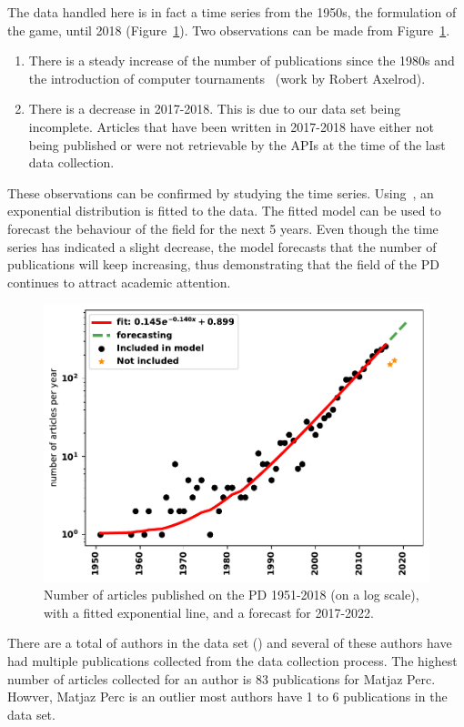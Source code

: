 \documentclass{article}
\theoremstyle{definition}
\newcommand{\authors}{}
\begin{document}
The data handled  here is in fact a time series from the 1950s, the formulation
of the game, until 2018 (Figure~\ref{fig:timeseries}). Two observations can be
made from Figure~\ref{fig:timeseries}.

\begin{enumerate}
    \item There is a steady increase of the number of publications since the
    1980s and the introduction of computer tournaments~\cite{Axelrod1981}
    (work by Robert Axelrod).
    \item There is a decrease in 2017-2018. This is due to our data set being
    incomplete. Articles that have been written in 2017-2018 have either not
    being published or were not retrievable by the APIs at the time of the last
    data collection.
\end{enumerate}

These observations can be confirmed by studying the time series.
Using~\cite{scipy}, an exponential distribution is fitted to the data.
The fitted model can be used to forecast the
behaviour of the field for the next 5 years. Even
though the time series has indicated a slight decrease, the model forecasts that
the number of publications will keep increasing, thus demonstrating that the
field of the PD continues to attract academic attention.

\begin{figure}[!hbtp]
    \centering
    \includegraphics[width=.50\textwidth]{./assets/images/forecasting.pdf}
    \caption{Number of articles published on the PD 1951-2018 (on a log scale),
    with a fitted exponential line, and a forecast for 2017-2022.}\label{fig:timeseries}
\end{figure}

There are a total of \authors authors in the data set (\cite{pd_data_2018}) and several of these
authors have had multiple publications collected from the data collection process.
The highest number of articles collected for an
author is 83 publications for Matjaz Perc. Howver, Matjaz Perc is an outlier
most authors have 1 to 6 publications in the data set.
\end{document}
